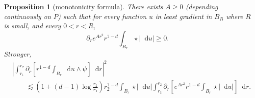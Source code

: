 \documentclass[reqno,12pt,letterpaper]{amsart}
\newcommand*\dif{\mathop{}\!\mathrm{d}}
\newtheorem{proposition}[theorem]{Proposition}
\theoremstyle{definition}
\numberwithin{equation}{section}
\begin{document}
\begin{proposition}[monotonicity formula]\label{Monotonicity Formula}\label{sharp monotonicity}
There exists $A \geq 0$ (depending continuously on $P$) such that for every function $u$ in least gradient in $B_R$ where $R$ is small, and every $0 < r < R$,
\begin{equation}\label{weak monotone}
\partial_r e^{Ar^2} r^{1 - d} \int_{B_r} \star|\dif u| \geq 0.
\end{equation}
Stronger,
\begin{align}\label{strong monotone}
&\left|\int_{r_1}^{r_2} \partial_r \left[r^{1 - d}\int_{B_r} \dif u \wedge \psi\right] \dif r\right|^2 \\
&\qquad \lesssim \left(1 + (d - 1)\log\frac{r_2}{r_1}\right)r_2^{1 - d}\int_{B_r} \star |\dif u| \int_{r_1}^{r_2} \partial_r \left[e^{Ar^2} r^{1 - d}\int_{B_r} \star |\dif u|\right] \dif r.
\end{align}
\end{proposition}
\end{document}
